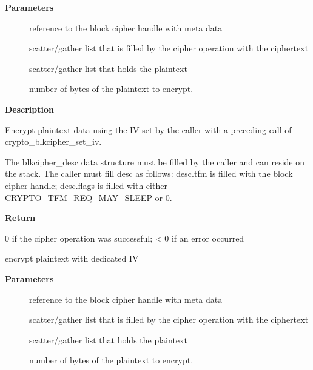 \documentclass[a4paper,8pt,english]{sphinxmanual}
\begin{document}
\textbf{Parameters}
\begin{description}
\item[{}] \leavevmode
reference to the block cipher handle with meta data

\item[{}] \leavevmode
scatter/gather list that is filled by the cipher operation with the
ciphertext

\item[{}] \leavevmode
scatter/gather list that holds the plaintext

\item[{}] \leavevmode
number of bytes of the plaintext to encrypt.

\end{description}

\textbf{Description}

Encrypt plaintext data using the IV set by the caller with a preceding
call of crypto\_blkcipher\_set\_iv.

The blkcipher\_desc data structure must be filled by the caller and can
reside on the stack. The caller must fill desc as follows: desc.tfm is filled
with the block cipher handle; desc.flags is filled with either
CRYPTO\_TFM\_REQ\_MAY\_SLEEP or 0.

\textbf{Return}

0 if the cipher operation was successful; \textless{} 0 if an error occurred

\begin{fulllineitems}
\label{crypto/api-skcipher:c.crypto_blkcipher_encrypt_iv}
encrypt plaintext with dedicated IV

\end{fulllineitems}


\textbf{Parameters}
\begin{description}
\item[{}] \leavevmode
reference to the block cipher handle with meta data

\item[{}] \leavevmode
scatter/gather list that is filled by the cipher operation with the
ciphertext

\item[{}] \leavevmode
scatter/gather list that holds the plaintext

\item[{}] \leavevmode
number of bytes of the plaintext to encrypt.

\end{description}
\end{document}
